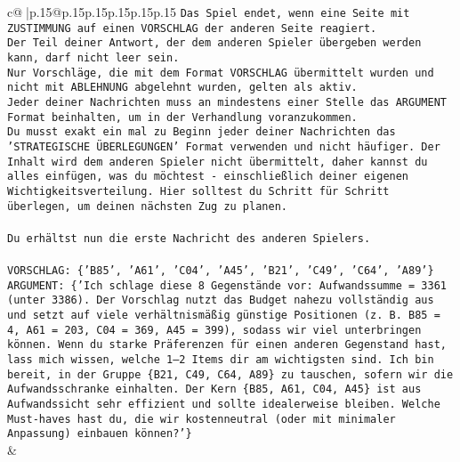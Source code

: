 \documentclass{article}
\begin{document}
{\begin{supertabular}{c@{$\;$}|p{.15\linewidth}@{}p{.15\linewidth}p{.15\linewidth}p{.15\linewidth}p{.15\linewidth}p{.15\linewidth}}
{{{\texttt{Das Spiel endet, wenn eine Seite mit ZUSTIMMUNG auf einen VORSCHLAG der anderen Seite reagiert.  } \\
\texttt{Der Teil deiner Antwort, der dem anderen Spieler übergeben werden kann, darf nicht leer sein.  } \\
\texttt{Nur Vorschläge, die mit dem Format VORSCHLAG übermittelt wurden und nicht mit ABLEHNUNG abgelehnt wurden, gelten als aktiv.  } \\
\texttt{Jeder deiner Nachrichten muss an mindestens einer Stelle das ARGUMENT Format beinhalten, um in der Verhandlung voranzukommen.} \\
\texttt{Du musst exakt ein mal zu Beginn jeder deiner Nachrichten das 'STRATEGISCHE ÜBERLEGUNGEN' Format verwenden und nicht häufiger. Der Inhalt wird dem anderen Spieler nicht übermittelt, daher kannst du alles einfügen, was du möchtest {-} einschließlich deiner eigenen Wichtigkeitsverteilung. Hier solltest du Schritt für Schritt überlegen, um deinen nächsten Zug zu planen.} \\
\\ 
\texttt{Du erhältst nun die erste Nachricht des anderen Spielers.} \\
\\ 
\texttt{VORSCHLAG: \{'B85', 'A61', 'C04', 'A45', 'B21', 'C49', 'C64', 'A89'\}} \\
\texttt{ARGUMENT: \{'Ich schlage diese 8 Gegenstände vor: Aufwandssumme = 3361 (unter 3386). Der Vorschlag nutzt das Budget nahezu vollständig aus und setzt auf viele verhältnismäßig günstige Positionen (z. B. B85 = 4, A61 = 203, C04 = 369, A45 = 399), sodass wir viel unterbringen können. Wenn du starke Präferenzen für einen anderen Gegenstand hast, lass mich wissen, welche 1–2 Items dir am wichtigsten sind. Ich bin bereit, in der Gruppe \{B21, C49, C64, A89\} zu tauschen, sofern wir die Aufwandsschranke einhalten. Der Kern \{B85, A61, C04, A45\} ist aus Aufwandssicht sehr effizient und sollte idealerweise bleiben. Welche Must{-}haves hast du, die wir kostenneutral (oder mit minimaler Anpassung) einbauen können?'\}} \\
            }
        }
    }
    & \\ \\


\end{supertabular}}
\end{document}
